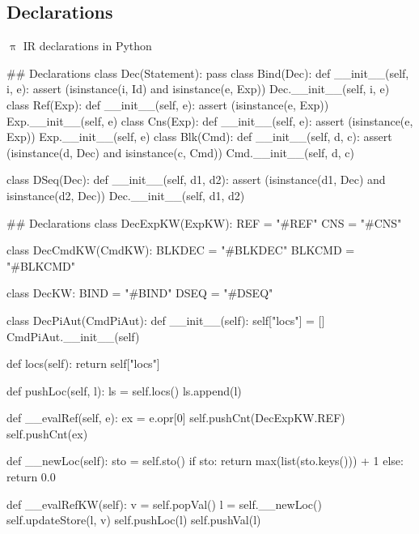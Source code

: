 \documentclass{beamer}
\begin{document}
\subsection{Declarations}
\begin{frame}{{\color{red}$\uppi$ IR} declarations in Python}


\begin{python}
## Declarations
class Dec(Statement): pass
class Bind(Dec):
   def __init__(self, i, e):
       assert (isinstance(i, Id) and isinstance(e, Exp))
       Dec.__init__(self, i, e)
class Ref(Exp):
   def __init__(self, e):
       assert (isinstance(e, Exp))
       Exp.__init__(self, e)
class Cns(Exp):
   def __init__(self, e):
       assert (isinstance(e, Exp))
       Exp.__init__(self, e)       
class Blk(Cmd):
   def __init__(self, d, c):
       assert (isinstance(d, Dec) and isinstance(c, Cmd))
       Cmd.__init__(self, d, c)
\end{python}
\framebreak
\begin{python}
class DSeq(Dec):
   def __init__(self, d1, d2):
       assert (isinstance(d1, Dec) and isinstance(d2, Dec))
       Dec.__init__(self, d1, d2)
\end{python}

\framebreak

\begin{python}
## Declarations
class DecExpKW(ExpKW):
   REF = "#REF"
   CNS = "#CNS"

class DecCmdKW(CmdKW):
   BLKDEC = "#BLKDEC"
   BLKCMD = "#BLKCMD"

class DecKW:
   BIND = "#BIND"
   DSEQ = "#DSEQ"

class DecPiAut(CmdPiAut):
   def __init__(self):
       self["locs"] = []
       CmdPiAut.__init__(self)

   def locs(self):
       return self["locs"]

   def pushLoc(self, l):
       ls = self.locs()
       ls.append(l)

   def __evalRef(self, e):
       ex = e.opr[0]
       self.pushCnt(DecExpKW.REF)
       self.pushCnt(ex)

   def __newLoc(self):
       sto = self.sto()
       if sto:
           return max(list(sto.keys())) + 1
       else:
           return 0.0

   def __evalRefKW(self):
       v = self.popVal()
       l = self.__newLoc()
       self.updateStore(l, v)
       self.pushLoc(l)
       self.pushVal(l)


\end{python}
\end{frame}
\end{document}
